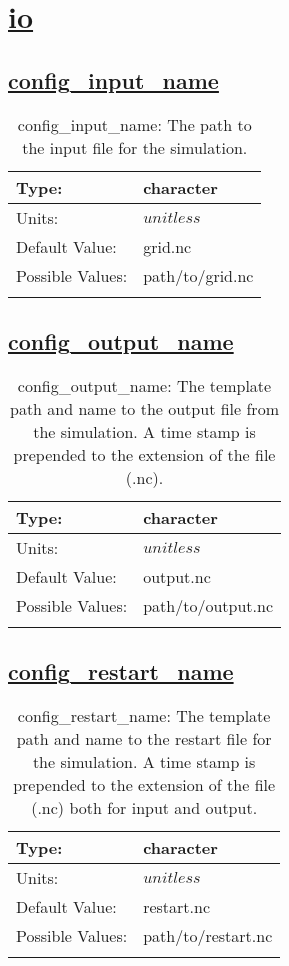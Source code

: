 \section[io]{\hyperref[sec:nm_tab_io]{io}}
\label{sec:nm_sec_io}
\subsection[config\_input\_name]{\hyperref[sec:nm_tab_io]{config\_input\_name}}
\label{subsec:nm_sec_config_input_name}
\begin{center}
\begin{longtable}{| p{2.0in} | p{4.0in} |}
    \hline
    Type: & character \\
    \hline
    Units: & $unitless$ \\
    \hline
    Default Value: & grid.nc \\
    \hline
    Possible Values: & path/to/grid.nc \\
    \hline
    \caption{config\_input\_name: The path to the input file for the simulation.}
\end{longtable}
\end{center}
\subsection[config\_output\_name]{\hyperref[sec:nm_tab_io]{config\_output\_name}}
\label{subsec:nm_sec_config_output_name}
\begin{center}
\begin{longtable}{| p{2.0in} | p{4.0in} |}
    \hline
    Type: & character \\
    \hline
    Units: & $unitless$ \\
    \hline
    Default Value: & output.nc \\
    \hline
    Possible Values: & path/to/output.nc \\
    \hline
    \caption{config\_output\_name: The template path and name to the output file from the simulation. A time stamp is prepended to the extension of the file (.nc).}
\end{longtable}
\end{center}
\subsection[config\_restart\_name]{\hyperref[sec:nm_tab_io]{config\_restart\_name}}
\label{subsec:nm_sec_config_restart_name}
\begin{center}
\begin{longtable}{| p{2.0in} | p{4.0in} |}
    \hline
    Type: & character \\
    \hline
    Units: & $unitless$ \\
    \hline
    Default Value: & restart.nc \\
    \hline
    Possible Values: & path/to/restart.nc \\
    \hline
    \caption{config\_restart\_name: The template path and name to the restart file for the simulation. A time stamp is prepended to the extension of the file (.nc) both for input and output.}
\end{longtable}
\end{center}
